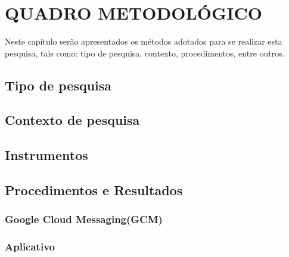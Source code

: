 \chapter{QUADRO METODOLÓGICO}

	\par Neste capítulo serão apresentados os métodos adotados para se realizar
	esta pesquisa, tais como: tipo de pesquisa, contexto, procedimentos, entre outros.
	
	\section{Tipo de pesquisa}
		
	
	\section{Contexto de pesquisa}
		
	
	\section{Instrumentos}
		
	
	\section{Procedimentos e Resultados}
		
	
	
			\subsection{Google Cloud Messaging(GCM)}
				
	
			\subsection{Aplicativo}
				
	
